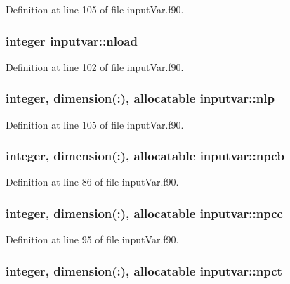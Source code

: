 Definition at line 105 of file input\-Var.\-f90.

\hypertarget{classinputvar_ac924c0b7af6a3dbae99f1a60dc9242ab}{
\subsubsection[{nload}]{\setlength{\rightskip}{0pt plus 5cm}integer inputvar\-::nload}}\label{classinputvar_ac924c0b7af6a3dbae99f1a60dc9242ab}


Definition at line 102 of file input\-Var.\-f90.

\hypertarget{classinputvar_a3f2f71983b35bd63596385392671f89d}{
\subsubsection[{nlp}]{\setlength{\rightskip}{0pt plus 5cm}integer, dimension(\-:), allocatable inputvar\-::nlp}}\label{classinputvar_a3f2f71983b35bd63596385392671f89d}


Definition at line 105 of file input\-Var.\-f90.

\hypertarget{classinputvar_a4f83c89634ccb8f94fca08a023648791}{
\subsubsection[{npcb}]{\setlength{\rightskip}{0pt plus 5cm}integer, dimension(\-:), allocatable inputvar\-::npcb}}\label{classinputvar_a4f83c89634ccb8f94fca08a023648791}


Definition at line 86 of file input\-Var.\-f90.

\hypertarget{classinputvar_a78f4d80d45d564c96dd9101258656f66}{
\subsubsection[{npcc}]{\setlength{\rightskip}{0pt plus 5cm}integer, dimension(\-:), allocatable inputvar\-::npcc}}\label{classinputvar_a78f4d80d45d564c96dd9101258656f66}


Definition at line 95 of file input\-Var.\-f90.

\hypertarget{classinputvar_a0f5eeaa6713564c7a3aa547b8ce8bae9}{
\subsubsection[{npct}]{\setlength{\rightskip}{0pt plus 5cm}integer, dimension(\-:), allocatable inputvar\-::npct}}\label{classinputvar_a0f5eeaa6713564c7a3aa547b8ce8bae9}


